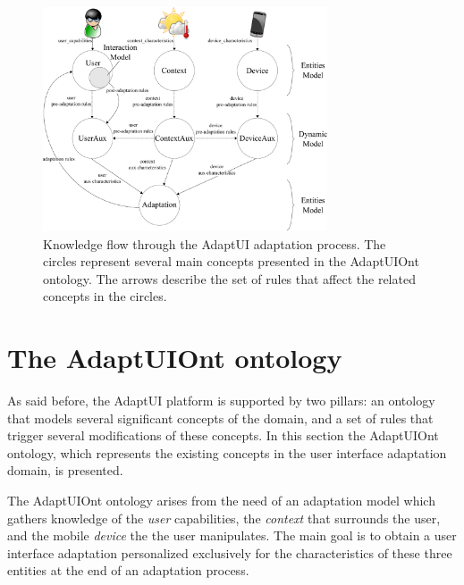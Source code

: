 \begin{figure}[H]
\centering
\includegraphics[width=0.75\textwidth]{flow_diagram.pdf}
\caption{Knowledge flow through the AdaptUI adaptation process. The circles
represent several main concepts presented in the AdaptUIOnt ontology. The arrows
describe the set of rules that affect the related concepts in the circles.}
\label{fig:flow_diagram}
\end{figure}


\section{The AdaptUIOnt ontology}
\label{sec:adaptui_model}

As said before, the AdaptUI platform is supported by two pillars: an ontology
that models several significant concepts of the domain, and a set of rules
that trigger several modifications of these concepts. In this section the
AdaptUIOnt ontology, which represents the existing concepts in the user
interface adaptation domain, is presented.
  
The AdaptUIOnt ontology arises from the need of an adaptation model which gathers
knowledge of the \textit{user} capabilities, the \textit{context} that surrounds
the user, and the mobile \textit{device} the the user manipulates. The main goal
is to obtain a user interface adaptation personalized exclusively for the
characteristics of these three entities at the end of an adaptation process.

